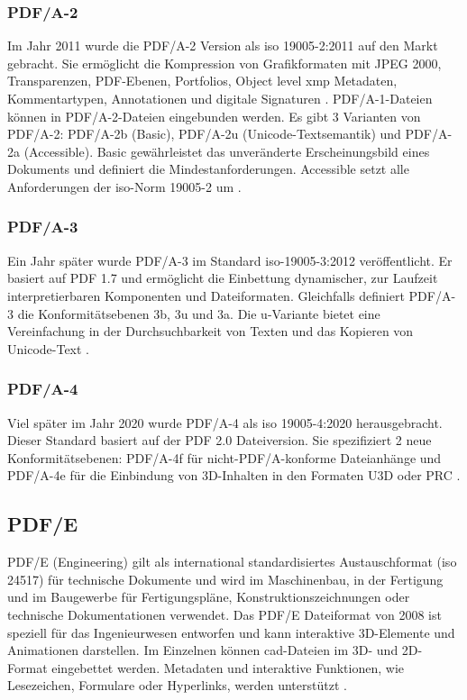 \subsubsection{PDF/A-2}
Im Jahr 2011 wurde die PDF/A-2 Version als \gls{iso} 19005-2:2011 auf den Markt gebracht. Sie ermöglicht die Kompression von Grafikformaten mit JPEG 2000, Transparenzen, PDF-Ebenen, Portfolios, Object level \gls{xmp} Metadaten, Kommentartypen, Annotationen und digitale Signaturen \cite{proj-consult}. PDF/A-1-Dateien können in PDF/A-2-Dateien eingebunden werden. Es gibt 3 Varianten von PDF/A-2: PDF/A-2b (Basic), PDF/A-2u (Unicode-Textsemantik) und PDF/A-2a (Accessible). Basic gewährleistet das unveränderte Erscheinungsbild eines Dokuments und definiert die Mindestanforderungen. Accessible setzt alle Anforderungen der \gls{iso}-Norm 19005-2 um \cite{adobe-pdf-a}. 

\subsubsection{PDF/A-3}
Ein Jahr später wurde PDF/A-3 im Standard \gls{iso}-19005-3:2012 veröffentlicht. Er basiert auf PDF 1.7 und ermöglicht die Einbettung dynamischer, zur Laufzeit interpretierbaren Komponenten und Dateiformaten. Gleichfalls definiert PDF/A-3 die Konformitätsebenen 3b, 3u und 3a. Die u-Variante bietet eine Vereinfachung in der Durchsuchbarkeit von Texten und das Kopieren von Unicode-Text \cite{proj-consult}.

\subsubsection{PDF/A-4}
Viel später im Jahr 2020 wurde PDF/A-4 als \gls{iso} 19005-4:2020 herausgebracht. Dieser Standard basiert auf der PDF 2.0 Dateiversion. Sie spezifiziert 2 neue Konformitätsebenen: PDF/A-4f für nicht-PDF/A-konforme Dateianhänge und PDF/A-4e für die Einbindung von 3D-Inhalten in den Formaten U3D oder PRC \cite{proj-consult}.

\subsection{PDF/E}
PDF/E (Engineering) gilt als international standardisiertes Austauschformat (\gls{iso} 24517) für technische Dokumente und wird im Maschinenbau, in der Fertigung und im Baugewerbe für Fertigungspläne, Konstruktionszeichnungen oder technische Dokumentationen verwendet. Das PDF/E Dateiformat von 2008 ist speziell für das Ingenieurwesen entworfen und kann interaktive 3D-Elemente und Animationen darstellen. Im Einzelnen können \gls{cad}-Dateien im 3D- und 2D-Format eingebettet werden. Metadaten und interaktive Funktionen, wie Lesezeichen, Formulare oder Hyperlinks, werden unterstützt \cite{adobe-pdf-e}.

